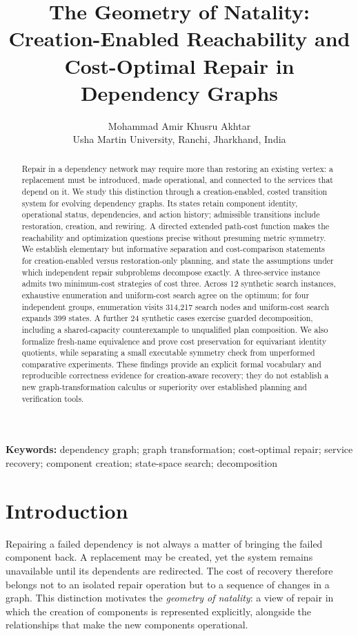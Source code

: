 \documentclass[11pt,a4paper]{article}
\title{The Geometry of Natality: Creation-Enabled Reachability and Cost-Optimal Repair in Dependency Graphs}
\author{Mohammad Amir Khusru Akhtar\\\small Usha Martin University, Ranchi, Jharkhand, India}
\date{}
\begin{document}
\maketitle
\begin{abstract}
Repair in a dependency network may require more than restoring an existing vertex: a replacement must be introduced, made operational, and connected to the services that depend on it. We study this distinction through a creation-enabled, costed transition system for evolving dependency graphs. Its states retain component identity, operational status, dependencies, and action history; admissible transitions include restoration, creation, and rewiring. A directed extended path-cost function makes the reachability and optimization questions precise without presuming metric symmetry. We establish elementary but informative separation and cost-comparison statements for creation-enabled versus restoration-only planning, and state the assumptions under which independent repair subproblems decompose exactly. A three-service instance admits two minimum-cost strategies of cost three. Across 12 synthetic search instances, exhaustive enumeration and uniform-cost search agree on the optimum; for four independent groups, enumeration visits 314,217 search nodes and uniform-cost search expands 399 states. A further 24 synthetic cases exercise guarded decomposition, including a shared-capacity counterexample to unqualified plan composition. We also formalize fresh-name equivalence and prove cost preservation for equivariant identity quotients, while separating a small executable symmetry check from unperformed comparative experiments. These findings provide an explicit formal vocabulary and reproducible correctness evidence for creation-aware recovery; they do not establish a new graph-transformation calculus or superiority over established planning and verification tools.
\end{abstract}
\noindent\textbf{Keywords:} dependency graph; graph transformation; cost-optimal repair; service recovery; component creation; state-space search; decomposition

\section{Introduction}
Repairing a failed dependency is not always a matter of bringing the failed component back. A replacement may be created, yet the system remains unavailable until its dependents are redirected. The cost of recovery therefore belongs not to an isolated repair operation but to a sequence of changes in a graph. This distinction motivates the \emph{geometry of natality}: a view of repair in which the creation of components is represented explicitly, alongside the relationships that make the new components operational.
\end{document}
